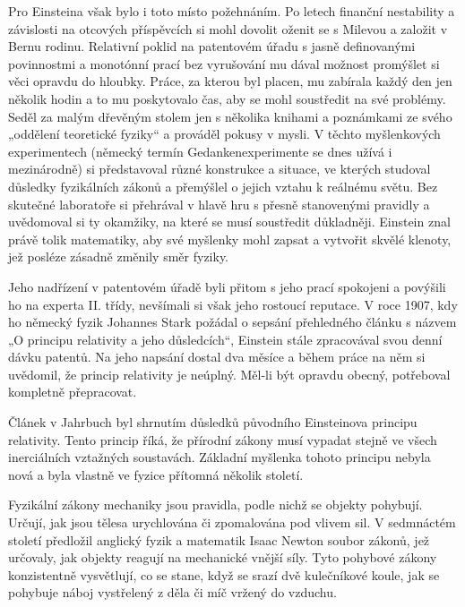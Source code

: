   Pro Einsteina však bylo i toto místo požehnáním. Po letech finanční nestability a závislosti na
  otcových příspěvcích si mohl dovolit oženit se s Milevou a založit v Bernu rodinu. Relativní
  poklid na patentovém úřadu s jasně definovanými povinnostmi a monotónní prací bez vyrušování mu
  dával možnost promýšlet si věci opravdu do hloubky. Práce, za kterou byl placen, mu zabírala každý
  den jen několik hodin a to mu poskytovalo čas, aby se mohl soustředit na své problémy. Seděl za
  malým dřevěným stolem jen s několika knihami a poznámkami ze svého „oddělení teoretické fyziky“ a
  prováděl pokusy v mysli. V těchto myšlenkových experimentech (německý termín Gedankenexperimente
  se dnes užívá i mezinárodně) si představoval různé konstrukce a situace, ve kterých studoval
  důsledky fyzikálních zákonů a přemýšlel o jejich vztahu k reálnému světu. Bez skutečné laboratoře
  si přehrával v hlavě hru s přesně stanovenými pravidly a uvědomoval si ty okamžiky, na které se
  musí soustředit důkladněji. Einstein znal právě tolik matematiky, aby své myšlenky mohl zapsat a
  vytvořit skvělé klenoty, jež posléze zásadně změnily směr fyziky. 

  Jeho nadřízení v patentovém úřadě byli přitom s jeho prací spokojeni a povýšili ho na experta II.
  třídy, nevšímali si však jeho rostoucí reputace. V roce 1907, kdy ho německý fyzik Johannes Stark
  požádal o sepsání přehledného článku s názvem „O principu relativity a jeho důsledcích“, Einstein
  stále zpracovával svou denní dávku patentů. Na jeho napsání dostal dva měsíce a během práce na něm
  si uvědomil, že princip relativity je neúplný. Měl-li být opravdu obecný, potřeboval kompletně
  přepracovat. 

  Článek v Jahrbuch byl shrnutím důsledků původního Einsteinova principu relativity. Tento princip
  říká, že přírodní zákony musí vypadat stejně ve všech inerciálních vztažných soustavách. Základní
  myšlenka tohoto principu nebyla nová a byla vlastně ve fyzice přítomná několik století.

  Fyzikální zákony mechaniky jsou pravidla, podle nichž se objekty pohybují. Určují, jak jsou tělesa
  urychlována či zpomalována pod vlivem sil. V sedmnáctém století předložil anglický fyzik a
  matematik Isaac Newton soubor zákonů, jež určovaly, jak objekty reagují na mechanické vnější síly.
  Tyto pohybové zákony konzistentně vysvětlují, co se stane, když se srazí dvě kulečníkové koule,
  jak se pohybuje náboj vystřelený z děla či míč vržený do vzduchu. 

